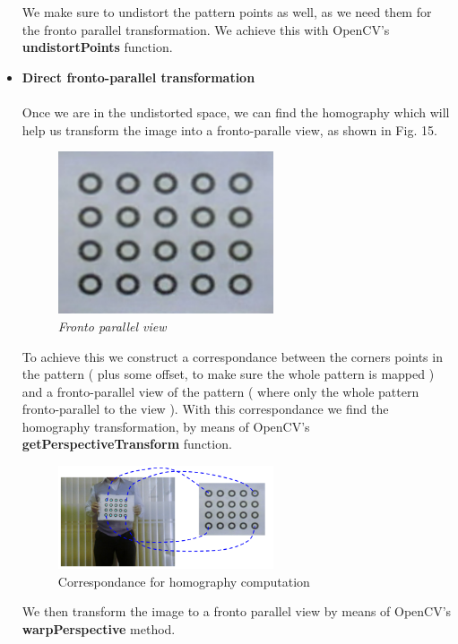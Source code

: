 \documentclass[journal]{IEEEtran}
\begin{document}
\begin{itemize}
        We make sure to undistort the pattern points as well, as we need them for the fronto parallel transformation. We achieve this with OpenCV's \textbf{undistortPoints} function.
        \\
    \item \textbf{Direct fronto-parallel transformation}
        \\
        \\
        Once we are in the undistorted space, we can find the homography which will help us transform the image into a fronto-paralle view, as shown in Fig. 15. 

        \begin{figure}[H]
        \centering
        \includegraphics[width=2.5in]{_img/report_4/img_refinement_fronto_view.png}
        \caption{ \textit{ Fronto parallel view } }
        \end{figure}

        To achieve this we construct a correspondance between the corners points in the pattern ( plus some offset, to make sure the whole pattern is mapped ) and a fronto-parallel view of the pattern ( where only the whole pattern fronto-parallel to the view ). With this correspondance we find the homography transformation, by means of OpenCV's \textbf{getPerspectiveTransform} function. 

        \begin{figure}[H]
        \centering
        \includegraphics[width=2.5in]{_img/report_4/img_homography.png}
        \caption{Correspondance for homography computation}
        \end{figure}
        
        We then transform the image to a fronto parallel view by means of OpenCV's \textbf{warpPerspective} method.
        \\


\end{itemize}
\end{document}
